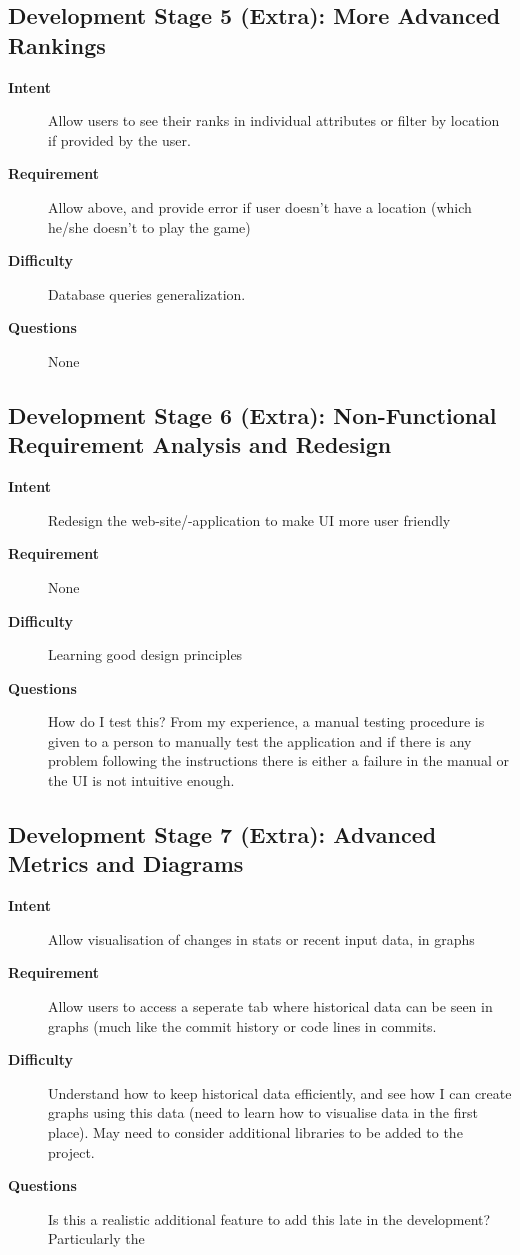\documentclass[11pt, a4paper]{article}
\begin{document}
\subsection{Development Stage 5 (Extra): More Advanced Rankings}

\begin{description}
\item[\textbf{Intent}] Allow users to see their ranks in individual attributes or filter by location if provided by the user.
\item[\textbf{Requirement}] Allow above, and provide error if user doesn't have a location (which he/she doesn't to play the game)
\item[\textbf{Difficulty}] Database queries generalization.
\item[\textbf{Questions}] None
\end{description}

\subsection{Development Stage 6 (Extra): Non-Functional Requirement Analysis and Redesign}

\begin{description}
\item[\textbf{Intent}] Redesign the web-site/-application to make UI more user friendly
\item[\textbf{Requirement}] None
\item[\textbf{Difficulty}]Learning good design principles
\item[\textbf{Questions}] How do I test this? From my experience, a manual testing procedure is given to a person to manually test the application and if there is any problem following the instructions there is either a failure in the manual or the UI is not intuitive enough.
\end{description}

\subsection{Development Stage 7 (Extra): Advanced Metrics and Diagrams}

\begin{description}
\item[\textbf{Intent}] Allow visualisation of changes in stats or recent input data, in graphs
\item[\textbf{Requirement}] Allow users to access a seperate tab where historical data can be seen in graphs (much like the commit history or code lines in commits.
\item[\textbf{Difficulty}] Understand how to keep historical data efficiently, and see how I can create graphs using this data (need to learn how to visualise data in the first place). May need to consider additional libraries to be added to the project. 
\item[\textbf{Questions}] Is this a realistic additional feature to add this late in the development? Particularly the  
\end{description}
\end{document}
